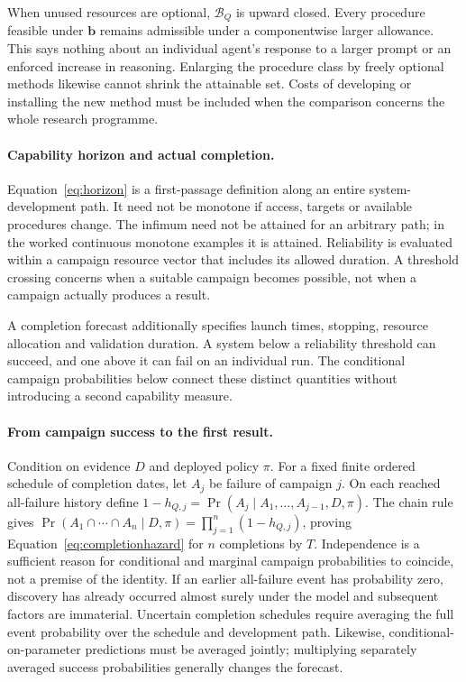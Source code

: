 When unused resources are optional, $\mathcal B_Q$ is upward closed. Every procedure feasible under $\mathbf b$ remains admissible under a componentwise larger allowance. This says nothing about an individual agent's response to a larger prompt or an enforced increase in reasoning. Enlarging the procedure class by freely optional methods likewise cannot shrink the attainable set. Costs of developing or installing the new method must be included when the comparison concerns the whole research programme.

\paragraph{Capability horizon and actual completion.}
Equation~\ref{eq:horizon} is a first-passage definition along an entire system-development path. It need not be monotone if access, targets or available procedures change. The infimum need not be attained for an arbitrary path; in the worked continuous monotone examples it is attained. Reliability is evaluated within a campaign resource vector that includes its allowed duration. A threshold crossing concerns when a suitable campaign becomes possible, not when a campaign actually produces a result.

A completion forecast additionally specifies launch times, stopping, resource allocation and validation duration. A system below a reliability threshold can succeed, and one above it can fail on an individual run. The conditional campaign probabilities below connect these distinct quantities without introducing a second capability measure.

\paragraph{From campaign success to the first result.}
Condition on evidence $D$ and deployed policy $\pi$. For a fixed finite ordered schedule of completion dates, let $A_j$ be failure of campaign $j$. On each reached all-failure history define $1-h_{Q,j}=\Pr(A_j\mid A_1,\ldots,A_{j-1},D,\pi)$. The chain rule gives $\Pr(A_1\cap\cdots\cap A_n\mid D,\pi)=\prod_{j=1}^n(1-h_{Q,j})$, proving Equation~\ref{eq:completionhazard} for $n$ completions by $T$. Independence is a sufficient reason for conditional and marginal campaign probabilities to coincide, not a premise of the identity. If an earlier all-failure event has probability zero, discovery has already occurred almost surely under the model and subsequent factors are immaterial. Uncertain completion schedules require averaging the full event probability over the schedule and development path. Likewise, conditional-on-parameter predictions must be averaged jointly; multiplying separately averaged success probabilities generally changes the forecast. 

